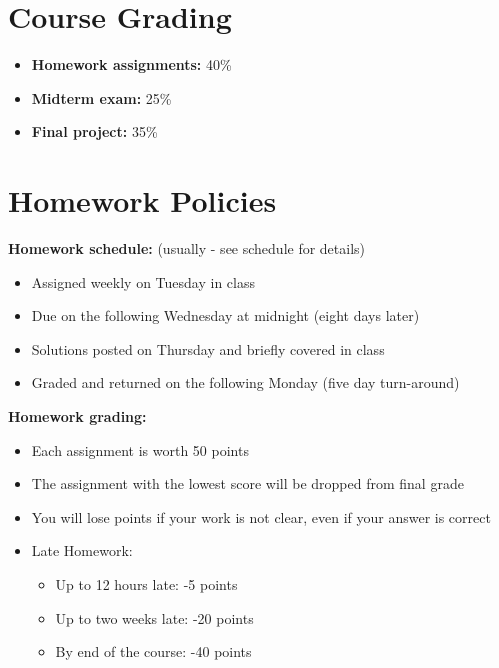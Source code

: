 \documentclass[onecolumn]{article}
\begin{document}
\section*{Course Grading}

\vspace{-0.6em} \begin{itemize}  \setlength\itemsep{-0.4em}
\item \textbf{Homework assignments: } 40\%
\item \textbf{Midterm exam: } 25\%
\item \textbf{Final project: } 35\%
\end{itemize}

\section*{Homework Policies}

\textbf{Homework schedule:}  (usually - see schedule for details)
\vspace{-0.6em} \begin{itemize}  \setlength\itemsep{-0.4em}
  \item Assigned weekly on Tuesday in class
  \item Due on the following Wednesday at midnight (eight days later)
  \item Solutions posted on Thursday and briefly covered in class
  \item Graded and returned on the following Monday (five day turn-around)
\end{itemize}

\textbf{Homework grading:}
  \vspace{-0.6em} \begin{itemize}  \setlength\itemsep{-0.4em}
  \item Each assignment is worth 50 points
  \item The assignment with the lowest score will be dropped from final grade
  \item You will lose points if your work is not clear, even if your answer is correct
  \item Late Homework:
  \vspace{-0.6em} \begin{itemize}  \setlength\itemsep{-0.1em}
    \item Up to 12 hours late: -5 points
    \item Up to two weeks late: -20 points
    \item By end of the course: -40 points
  \end{itemize}
\end{itemize}
\end{document}
